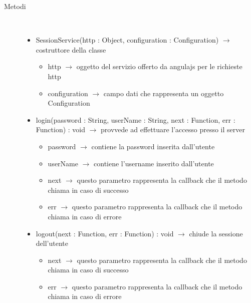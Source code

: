 \begin{description}
\item[Metodi] \hfill \\
\vspace{-7mm}
\begin{itemize}
	\item SessionService(http : Object, configuration : Configuration) $\rightarrow$ costruttore della classe\begin{itemize}
		\item http $\rightarrow$ oggetto del servizio offerto da angulajs per le richieste http
		\item configuration $\rightarrow$ campo dati che rappresenta un oggetto Configuration
	\end{itemize}
	
	\item login(password : String, userName : String, next : Function, err : Function) : void $\rightarrow$ provvede ad effettuare l'accesso presso il server\begin{itemize}
		\item password $\rightarrow$ contiene la password inserita dall'utente
		\item userName $\rightarrow$ contiene l'username inserito dall'utente
		\item next $\rightarrow$ questo parametro rappresenta la callback che il metodo chiama in caso di successo
		\item err $\rightarrow$ questo parametro rappresenta la callback che il metodo chiama in caso di errore
	\end{itemize}
	
	\item logout(next : Function, err : Function) : void $\rightarrow$ chiude la sessione dell'utente\begin{itemize}
		\item next $\rightarrow$ questo parametro rappresenta la callback che il metodo chiama in caso di successo
		\item err $\rightarrow$ questo parametro rappresenta la callback che il metodo chiama in caso di errore
	\end{itemize}
	
\end{itemize}

\end{description}

